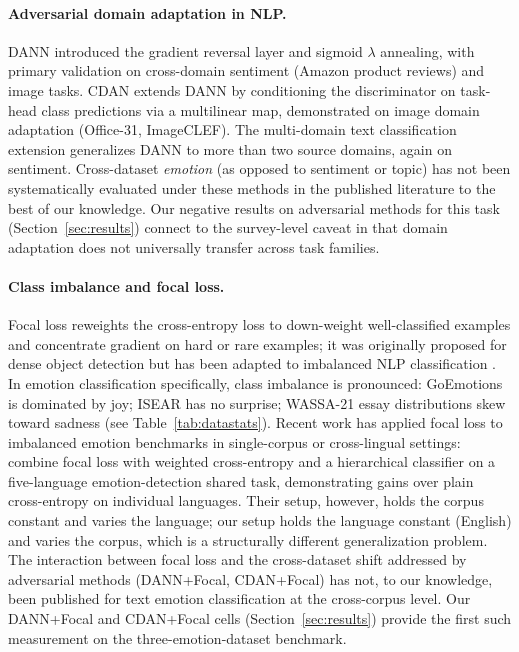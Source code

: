 \paragraph{Adversarial domain adaptation in NLP.}
DANN \citep{ganin2016dann} introduced the gradient reversal layer
and sigmoid $\lambda$ annealing, with primary validation on
cross-domain sentiment (Amazon product reviews) and image tasks.
CDAN \citep{long2018cdan} extends DANN by conditioning the
discriminator on task-head class predictions via a multilinear map,
demonstrated on image domain adaptation (Office-31, ImageCLEF).
The multi-domain text classification extension
\citep{chen2018multinomial} generalizes DANN to more than two source
domains, again on sentiment. Cross-dataset \emph{emotion} (as opposed
to sentiment or topic) has not been systematically evaluated under
these methods in the published literature to the best of our
knowledge. Our negative results on adversarial methods for this task
(Section~\ref{sec:results}) connect to the survey-level caveat in
\citet{wilson2020dasurvey} that domain adaptation does not
universally transfer across task families.

\paragraph{Class imbalance and focal loss.}
Focal loss \citep{lin2017focal} reweights the cross-entropy loss to
down-weight well-classified examples and concentrate gradient on hard
or rare examples; it was originally proposed for dense object
detection but has been adapted to imbalanced NLP classification
\citep{suresh2021labelaware}. In emotion classification specifically,
class imbalance is pronounced: GoEmotions is dominated by joy;
ISEAR has no surprise; WASSA-21 essay distributions skew toward
sadness (see Table~\ref{tab:datastats}). Recent work has applied
focal loss to imbalanced emotion benchmarks in single-corpus or
cross-lingual settings: \citet{vazquez2024pcicunam} combine focal
loss with weighted cross-entropy and a hierarchical classifier on a
five-language emotion-detection shared task, demonstrating gains over
plain cross-entropy on individual languages. Their setup, however,
holds the corpus constant and varies the language; our setup holds
the language constant (English) and varies the corpus, which is a
structurally different generalization problem.
The interaction between focal loss and the cross-dataset shift
addressed by adversarial methods (DANN+Focal, CDAN+Focal) has not,
to our knowledge, been published for text emotion classification at
the cross-corpus level. Our DANN+Focal and CDAN+Focal cells
(Section~\ref{sec:results}) provide the first such measurement on the
three-emotion-dataset benchmark.

